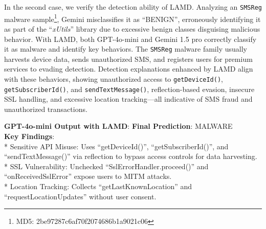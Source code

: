 In the second case, we verify the detection ability of LAMD. Analyzing an \verb|SMSReg| malware sample\footnote{MD5: 2be97287c6af70f2074686b1a9021c06}, Gemini misclassifies it as ``BENIGN'', erroneously identifying it as part of the ``\textit{xUtils}” library due to excessive benign classes disguising malicious behavior. With LAMD, both GPT-4o-mini and Gemini 1.5 pro correctly classify it as malware and identify key behaviors. The \verb|SMSReg| malware family usually harvests device data, sends unauthorized SMS, and registers users for premium services to evading detection. Detection explanations enhanced by LAMD align with these behaviors, showing unauthorized access to \verb|getDeviceId()|, \verb|getSubscriberId()|, and \verb|sendTextMessage()|, reflection-based evasion, insecure SSL handling, and excessive location tracking—all indicative of SMS fraud and unauthorized transactions.



\begin{tcolorbox}[fontupper=\small, fontlower=\small, 
left=2pt, %
right=2pt, %
top=3pt, %
bottom=3pt, %
before upper=\raggedright, 
after upper={\vspace{-4pt}},
before lower=\raggedright]
\textbf{GPT-4o-mini Output with LAMD}:
\tcblower
\textbf{Final Prediction}: MALWARE \\
\textbf{Key Findings}: \\
* Sensitive API Misuse: Uses ``getDeviceId()'', ``getSubscriberId()'', and ``sendTextMessage()'' via reflection to bypass access controls for data harvesting.\\
* SSL Vulnerability: Unchecked ``SslErrorHandler.proceed()'' and ``onReceivedSslError'' expose users to MITM attacks.\\
* Location Tracking: Collects ``getLastKnownLocation'' and ``requestLocationUpdates'' without user consent.
\end{tcolorbox}


